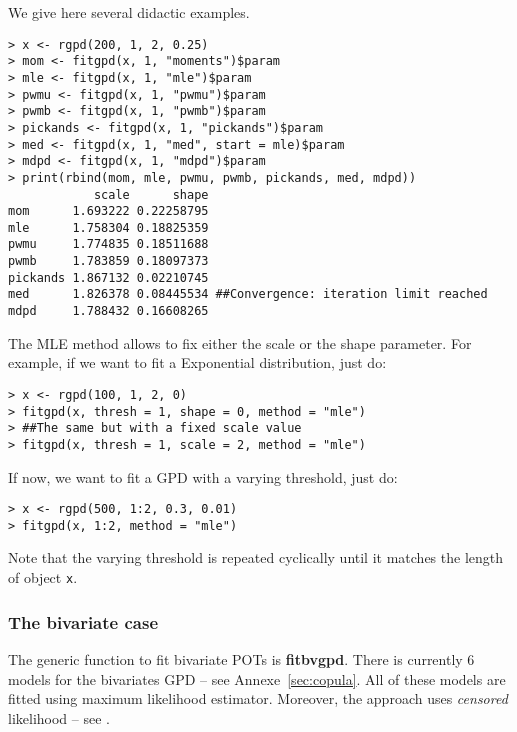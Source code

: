 \documentclass[11pt,a4paper]{article}
\numberwithin{equation}{section}
\theoremstyle{definition}
\begin{document}
We give here several didactic examples.
\begin{verbatim}
> x <- rgpd(200, 1, 2, 0.25)                             
> mom <- fitgpd(x, 1, "moments")$param                        
> mle <- fitgpd(x, 1, "mle")$param                       
> pwmu <- fitgpd(x, 1, "pwmu")$param                     
> pwmb <- fitgpd(x, 1, "pwmb")$param                     
> pickands <- fitgpd(x, 1, "pickands")$param             
> med <- fitgpd(x, 1, "med", start = mle)$param          
> mdpd <- fitgpd(x, 1, "mdpd")$param                     
> print(rbind(mom, mle, pwmu, pwmb, pickands, med, mdpd))
            scale      shape
mom      1.693222 0.22258795
mle      1.758304 0.18825359
pwmu     1.774835 0.18511688
pwmb     1.783859 0.18097373
pickands 1.867132 0.02210745
med      1.826378 0.08445534 ##Convergence: iteration limit reached
mdpd     1.788432 0.16608265
\end{verbatim}

The MLE method allows to fix either the scale or the shape
parameter. For example, if we want to fit a Exponential distribution,
just do:
\begin{verbatim}
> x <- rgpd(100, 1, 2, 0)
> fitgpd(x, thresh = 1, shape = 0, method = "mle")
> ##The same but with a fixed scale value
> fitgpd(x, thresh = 1, scale = 2, method = "mle")
\end{verbatim}
If now, we want to fit a GPD with a varying threshold, just do:
\begin{verbatim}
> x <- rgpd(500, 1:2, 0.3, 0.01)
> fitgpd(x, 1:2, method = "mle")
\end{verbatim}

Note that the varying threshold is repeated cyclically until it
matches the length of object \verb|x|.

\subsubsection{The bivariate case}

The generic function to fit bivariate POTs is \textbf{fitbvgpd}. There
is currently 6 models for the bivariates GPD -- see
Annexe~\ref{sec:copula}. All of these models are fitted using maximum
likelihood estimator. Moreover, the approach uses \emph{censored}
likelihood -- see \citep{Smith1997}.
\end{document}
